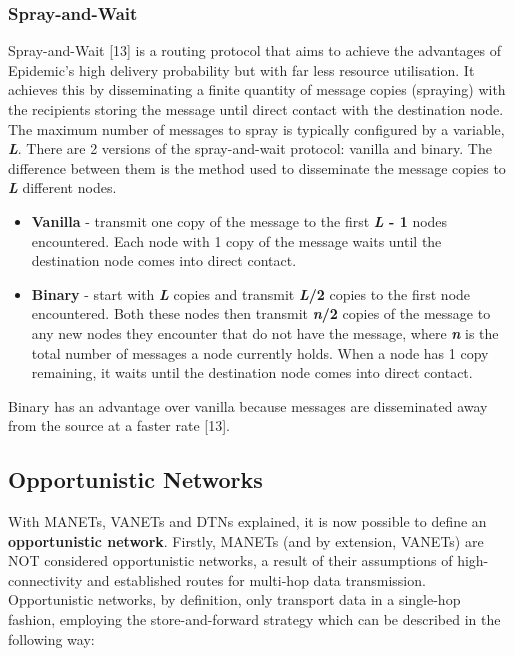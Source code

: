 \documentclass{article}
\begin{document}
\subsubsection{Spray-and-Wait}
Spray-and-Wait [13] is a routing protocol that aims to achieve the advantages of Epidemic's high delivery probability but with far less resource utilisation. It achieves this by disseminating a finite quantity of message copies (spraying) with the recipients storing the message until direct contact with the destination node. The maximum number of messages to spray is typically configured by a variable, \textbf{\textit{L}}. There are 2 versions of the spray-and-wait protocol: vanilla and binary. The difference between them is the method used to disseminate the message copies to \textbf{\textit{L}} different nodes.
\begin{itemize}
	\item \textbf{Vanilla} - transmit one copy of the message to the first \textbf{\textit{L} - 1} nodes encountered. Each node with 1 copy of the message waits until the destination node comes into direct contact.
	\item \textbf{Binary} - start with \textbf{\textit{L}} copies and transmit \textbf{\textit{L}/2} copies to the first node encountered. Both these nodes then transmit \textbf{\textit{n}/2} copies of the message to any new nodes they encounter that do not have the message, where \textbf{\textit{n}} is the total number of messages a node currently holds. When a node has 1 copy remaining, it waits until the destination node comes into direct contact.
\end{itemize}
Binary has an advantage over vanilla because messages are disseminated away from the source at a faster rate [13].

\subsection{Opportunistic Networks}
With MANETs, VANETs and DTNs explained, it is now possible to define an \textbf{opportunistic network}. Firstly, MANETs (and by extension, VANETs) are NOT considered opportunistic networks, a result of their assumptions of high-connectivity and established routes for multi-hop data transmission. Opportunistic networks, by definition, only transport data in a single-hop fashion, employing the store-and-forward strategy which can be described in the following way:
\end{document}
